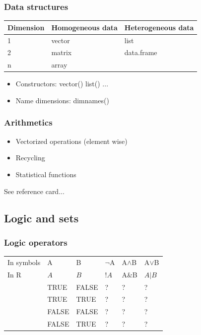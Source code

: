 \documentclass{beamer}
\begin{document}
\begin{frame}
	\frametitle{Data structures}
	\begin{table}
		\begin{tabular}{l l l}
			\toprule
			\textbf{Dimension}&\textbf{Homogeneous data}&\textbf{Heterogeneous 
			data}\\
			\midrule
			1 & vector & list \\
			2 & matrix & data.frame \\
			n & array &  \\
			\bottomrule
		\end{tabular}
	\end{table}
	
		\begin{itemize}
			\item Constructors: vector() list() ...
			\item Name dimensions: dimnames()
		\end{itemize}
\end{frame}


\begin{frame}
	\frametitle{Arithmetics}
	\begin{itemize}
		\item Vectorized operations (element wise)
		\item Recycling
		\item Statistical functions
	\end{itemize}
	
	See reference card...
\end{frame}

\subsection{Logic and sets}

\begin{frame}
	\frametitle{Logic operators}
	\begin{table}
		\begin{tabular}{l l l l l l}
			\toprule
			In symbols & A & B & $\neg$A & A$\land$B & A$\lor$B\\
			In R & $A$ & $B$ & $!A$ & A\&B & $A \vert B$ \\
			& TRUE & FALSE & ? & ? & ? \\
			& TRUE & TRUE & ? & ? & ? \\
			& FALSE & FALSE & ? & ? & ? \\
			& FALSE & TRUE & ? & ? & ? \\
			\bottomrule
		\end{tabular}
	\end{table}
\end{frame}
\end{document}
